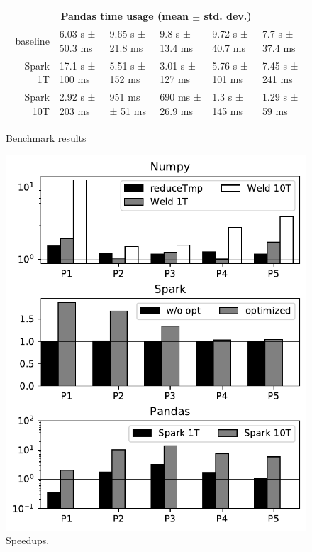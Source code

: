 \documentclass[sigconf]{acmart}\settopmatter{printfolios=true,printccs=false,printacmref=false}\setcopyright{none}
\begin{document}
\begin{figure}[ht]
\begin{minipage}[b]{0.7\linewidth}
\begin{tabular}{r|l|l|l|l|l}
  
  \hline
  \multicolumn{6}{c}{Pandas time usage (mean $\pm$ std. dev.)} \\
  \hline
  baseline & 6.03 s ± 50.3 ms
           & 9.65 s ± 21.8 ms
           & 9.8 s ± 13.4 ms
           & 9.72 s ± 40.7 ms
           & 7.7 s ± 37.4 ms\\
  
  Spark 1T & 17.1 s ± 100 ms 
          & 5.51 s ± 152 ms
          & 3.01 s ± 127 ms
          & 5.76 s ± 101 ms
          & 7.45 s ± 241 ms\\
          
  Spark 10T & 2.92 s ± 203 ms
          & 951 ms ± 51 ms
          & 690 ms ± 26.9 ms
          & 1.3 s ± 145 ms
          & 1.29 s ± 59 ms\\
  \hline
  \end{tabular}
  \caption{Benchmark results}
  \label{tab:results}
\end{minipage}
\hspace{0.01\linewidth}
\begin{minipage}[b]{0.28\linewidth}
  \centering
  \includegraphics[width=\textwidth]{figure/speedup.pdf}
  \caption{Speedups.}
  \label{fig:speedup}
\end{minipage}
\end{figure}
\end{document}
